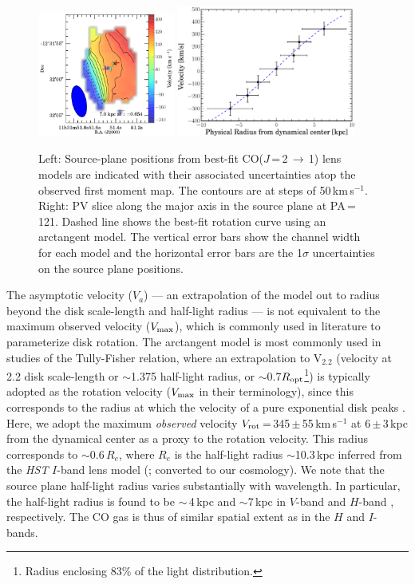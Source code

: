 \documentclass[]{emulateapj}
\newcommand{\rarr}{$\rightarrow$}
\newcommand{\bco}{\mbox{CO($J$\,=\,2\,\rarr\,1)}\xspace}
\newcommand{\kms}{\mbox{km\,s$^{-1}$}\xspace}
\begin{document}
\begin{figure}[!htbp]
\centering
\includegraphics[trim=0 0 30 0, clip, width=0.4\textwidth]{f9a.pdf}
\includegraphics[width=0.525\textwidth]{f9b.eps}
\caption{Left: Source-plane positions from best-fit \bco lens models are indicated with their associated uncertainties atop
the observed first moment map. The contours are at steps of 50\,\kms.
Right: PV slice along the major axis in the source plane at PA\,=\,121\degr.
Dashed line shows the best-fit rotation curve using an arctangent model.
The vertical error bars show the channel width for
each model and the horizontal error bars are the
1$\sigma$ uncertainties on the source plane positions.
\label{fig:PV}}
\end{figure}

The asymptotic velocity ($V_{a}$) --- an extrapolation of the model
out to radius beyond the disk scale-length and half-light radius ---
is not equivalent to the maximum observed velocity ($V_{\rm max}$),
which is commonly used in literature to parameterize disk rotation.
The arctangent model is most commonly used in studies of the
Tully-Fisher relation, where an extrapolation to V$_{2.2}$ (velocity
at 2.2 disk scale-length or $\sim$1.375 half-light radius,
or $\sim$0.7$R_{\rm opt}$\footnote{Radius enclosing 83\% of the light
distribution.}) is typically adopted
as the rotation velocity ($V_{\rm max}$ in their
terminology), since this corresponds to the radius at which the velocity
of a pure exponential disk peaks \citep{Courteau97b}.
Here, we adopt the maximum {\em observed} velocity
$V_{\rm rot}$\,=\,345\,$\pm$\,55\,\kms at 6\,$\pm$\,3\,kpc from the
dynamical center as a proxy to the rotation velocity.
This radius corresponds to $\sim$0.6\,$R_e$, where $R_e$ is the half-light
radius $\sim$10.3\,kpc inferred from the {\it HST} $I$-band
lens model (; converted to
our cosmology).
We note that the source plane half-light radius varies substantially with
wavelength. In particular, the half-light radius is found to be
$\sim$\,4\,kpc and $\sim$7\,kpc in $V$-band
 and $H$-band , respectively.
The CO gas is thus of similar spatial
extent as in the $H$ and $I$-bands.
\end{document}
